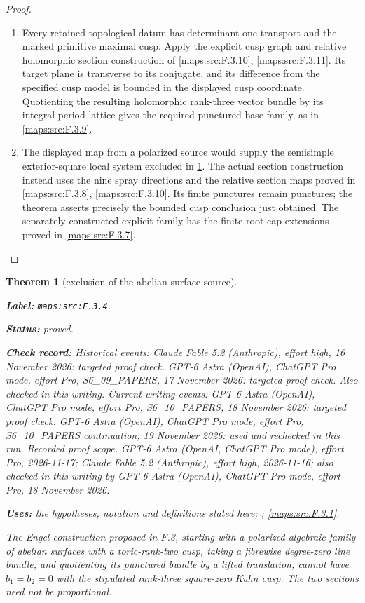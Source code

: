\documentclass[11pt,a4paper]{article}
\newtheorem{theorem}{Theorem}[section]
\theoremstyle{definition}
\newcommand{\StatementRecord}[4]{\par\smallskip\begingroup\upshape\raggedright\noindent\textbf{Label:} \nolinkurl{#1}.\par\noindent\textbf{Status:} #2.\par\noindent\textbf{Check record:} #3.\par\noindent\textbf{Uses:} #4.\par\endgroup\smallskip}
\begin{document}
\begin{proof}
\begin{enumerate}[label=\arabic*.]
\item Every retained topological datum has determinant-one transport
and the marked primitive maximal cusp. Apply the explicit cusp graph
and relative holomorphic section construction of
\cref{maps:src:F.3.10}, \cref{maps:src:F.3.11}. Its target plane is transverse
to its conjugate, and its difference from the specified cusp model is
bounded in the displayed cusp coordinate. Quotienting the resulting
holomorphic rank-three vector bundle by its integral period lattice
gives the required punctured-base family, as in \cref{maps:src:F.3.9}.
\item The displayed map from a polarized source would supply the
semisimple exterior-square local system excluded in
\cref{maps:src:F.3.4}. The actual section construction instead uses
the nine spray directions and the relative section maps proved in
\cref{maps:src:F.3.8}, \cref{maps:src:F.3.10}. Its finite punctures remain
punctures; the theorem asserts precisely the bounded cusp conclusion
just obtained. The separately constructed explicit family has the
finite root-cap extensions proved in \cref{maps:src:F.3.7}.
\end{enumerate}
\end{proof}





\begin{theorem}[exclusion of the abelian-surface source]\label{maps:src:F.3.4}
\StatementRecord{maps:src:F.3.4}{proved}{Historical events: Claude Fable 5.2 (Anthropic), effort high, 16 November 2026: targeted proof check. GPT-6 Astra (OpenAI), ChatGPT Pro mode, effort Pro, S6\_09\_PAPERS, 17 November 2026: targeted proof check. Also checked in this writing. Current writing events: GPT-6 Astra (OpenAI), ChatGPT Pro mode, effort Pro, S6\_10\_PAPERS, 18 November 2026: targeted proof check. GPT-6 Astra (OpenAI), ChatGPT Pro mode, effort Pro, S6\_10\_PAPERS continuation, 19 November 2026: used and rechecked in this run. \emph{Recorded proof scope.} GPT-6 Astra (OpenAI, ChatGPT Pro mode), effort Pro, 2026-11-17; Claude Fable 5.2 (Anthropic), effort high, 2026-11-16; also checked in this writing by GPT-6 Astra (OpenAI), ChatGPT Pro mode, effort Pro, 18 November 2026}{the hypotheses, notation and definitions stated here; \cite[Definition 4.2.4 and Proposition 4.2.5, p.~44; Theorem 4.2.6, p.~45]{ffDeligne}; \cref{maps:src:F.3.1}}


The Engel construction proposed in F.3, starting with a polarized
algebraic family of abelian surfaces with a toric-rank-two cusp,
taking a fibrewise degree-zero line bundle, and quotienting its
punctured bundle by a lifted translation, cannot have $b_1=b_2=0$
with the stipulated rank-three square-zero Kuhn cusp.
The two sections need not be proportional.

\end{theorem}
\end{document}
